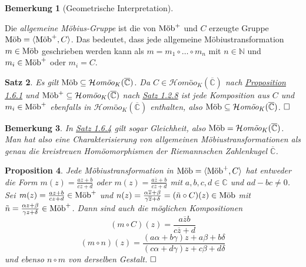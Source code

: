 \documentclass[11pt]{book}
\numberwithin{dummy}{section}
\newtheorem{theorem}{Satz}[section]
\newtheorem{proposition}[theorem]{Proposition}
\newtheorem{remark}[theorem]{Bemerkung}
\theoremstyle{nonumberbreak}
\newenvironment{defin}[1][]{\ifthenelse{\equal{#1}{}}{\definition}{\definition[#1]}\rm}{\enddefinition}
\newenvironment{pr}[1][]{\ifthenelse{\equal{#1}{}}{\proof}{\proof[#1]}\rm}{\endproof}
\newcommand{\C}{\mathbb{C}}
\newcommand{\CC}{\overline{\mathbb{C}}}
\newcommand{\homoekcc}{\mathcal{H}\textit{omöo}_K(\CC)}
\newcommand{\mob}{\textup{Möb}^+}
\newcommand{\amob}{\textup{Möb}}
\begin{document}
\begin{spacing}{1.4}
\begin{remark}[Geometrische Interpretation]
\end{remark}


\begin{defin}
Die \textit{allgemeine Möbius-Gruppe} ist die von $\mob$ und $C$ erzeugte Gruppe $\amob = \langle \mob, C \rangle$. Das bedeutet, dass jede allgemeine Möbiustransformation $m \in \amob$ geschrieben werden kann als
$m= m_1 \circ \ldots\circ m_n$
mit $n \in \mathbb{N}$ und $m_i \in \mob$ oder $m_i =C$. 

\end{defin}

\hypertarget{satzeinssechsvier}{}
\begin{theorem}   %
Es gilt $\amob \subseteq \homoekcc$.
\begin{pr}
Da $C \in \homoekcc$ nach \hyperlink{propeinssechseins}{Proposition 1.6.1} und $\mob \subseteq \homoekcc$ nach \hyperlink{satzeinszweiacht}{Satz 1.2.8} ist jede Komposition aus $C$ und $m_i \in \mob$ ebenfalls in $\homoekcc$ enthalten, also $\amob \subseteq \homoekcc$. $\hfill \Box$
\end{pr}

\end{theorem}

\begin{remark}
In \hyperlink{satzeinssechsvier}{Satz 1.6.4} gilt sogar Gleichheit, also $\amob = \homoekcc$. Man hat also eine Charakterisierung von allgemeinen Möbiustransformationen als genau die kreistreuen Homöomorphismen der Riemannschen Zahlenkugel $\CC$.
\end{remark}


\hypertarget{propeinssechssechs}{}
\begin{proposition} %
 Jede Möbiustransformation in $\amob = \langle \mob, C\rangle$ hat entweder die Form $m(z)= \frac{az+b}{cz+d}$ oder $m(z)= \frac{a \overline{z}+b}{c\overline{z}+d}$ mit $a,b,c,d \in \C$ und $ad-bc \neq 0$.
\begin{pr}
Sei $m(z) = \frac{az+b}{cz+d} \in \mob$ und $n(z) = \frac{\alpha\overline{z} + \beta}{\gamma \overline{z} + \delta} = (\tilde{n} \circ C)(z) \in \amob$ mit $\tilde{n} = \frac{\alpha z + \beta}{\gamma z + \delta} \in \mob$. Dann sind auch die möglichen Kompositionen 
$$(m \circ C)(z) = \frac{a \overline{z} b}{c \overline{z} +d}$$
$$(m \circ n)(z) = \frac{(a\alpha + b \gamma)z + a\beta + b \delta}{(c \alpha + d\gamma)z + c \beta + d \delta}$$
und ebenso $n \circ m$ von derselben Gestalt. $\hfill \Box$

\end{pr}


\end{proposition}
\end{spacing}
\end{document}
